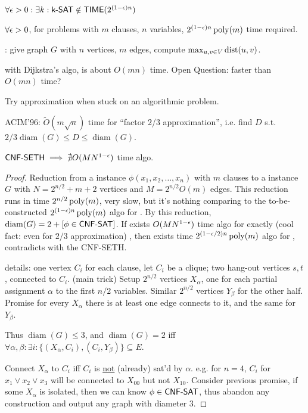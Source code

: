 \documentclass{article}
\newcommand{\diam}{\operatorname{diam}}
\begin{document}
\begin{conjecture}
  \( \forall \epsilon>0: \exists k: \text{\sf k-SAT} \notin \text{\sf TIME}(2^{(1-\epsilon) n}) \)
\end{conjecture}

\begin{conjecture}
  \(\forall \epsilon>0\), for  problems with \(m\) clauses, \(n\) variables, \(2^{(1-\epsilon)n} \operatorname{poly}(m)\) time required.
\end{conjecture}

\begin{definition}
  : give graph \(G\) with \(n\) vertices, \(m\) edges, compute \(\max_{u, v \in V} \textnormal{dist}(u, v)\).
\end{definition}

with Dijkstra's algo,  is about \(O(mn)\) time.
Open Question: faster than \(O(mn)\) time?

\begin{remark}
  Try approximation when stuck on an algorithmic problem.
\end{remark}

ACIM'96: \(\tilde{O}(m \sqrt{n})\) time for ``factor 2/3 approximation'', i.e. find \(D\) s.t. \(2/3 \diam(G) \leq D \leq \diam(G)\).

\begin{theorem}
  \(\text{\sf CNF-SETH} \implies \nexists O(MN^{1-\epsilon})\) time  algo.
\end{theorem}

\begin{proof}
  Reduction from a  instance \(\phi(x_1, x_2, \ldots, x_n)\) with \(m\) clauses to a  instance \(G\) with \(N = 2^{n/2} + m + 2\) vertices and \(M=2^{n/2} O(m)\) edges. This reduction runs in time \(2^{n/2} \operatorname{poly}(m)\), very slow, but it's nothing comparing to the to-be-constructed \(2^{(1-\epsilon)n} \operatorname{poly}(m)\) algo for . By this reduction, \(\diam(G) = 2 + [\phi \in \prob{CNF-SAT}]\). If exists \(O(MN^{1-\epsilon})\) time algo for exactly (cool fact: even for \(2/3\) approximation) , then exists time \(2^{(1-\epsilon/2) n}\operatorname{poly}(m)\) algo for , contradicts with the CNF-SETH.

  details:
  one vertex \(C_i\) for each clause, let \(C_i\) be a clique;
  two hang-out vertices \(s, t\), connected to  \(C_i\).
  (main trick) Setup \(2^{n/2}\) vertices \(X_\alpha\), one for each partial assignment \(\alpha\) to the first \(n/2\) variables. Similar \(2^{n/2}\) vertices \(Y_\beta\) for the other half.
  Promise for every \(X_\alpha\) there is at least one edge connects to it, and the same for \(Y_\beta\).

  Thus \(\diam(G) \leq 3\), and \(\diam(G) = 2\) iff \(\forall \alpha, \beta: \exists i: \{ (X_\alpha, C_i), (C_i, Y_\beta) \} \subseteq E\).

  Connect \(X_\alpha\) to \(C_i\) iff \(C_i\) is \ul{not} (already) sat'd by \(\alpha\). e.g. for \(n = 4\), \(C_i\) for \(x_1 \vee x_2 \vee x_3\) will be connected to \(X_{00}\) but not \(X_{10}\).
  Consider previous promise, if some \(X_\alpha\) is isolated, then we can know \(\phi \in \text{\sf CNF-SAT}\), thus abandon any construction and output any graph with diameter 3.
\end{proof}
\end{document}
